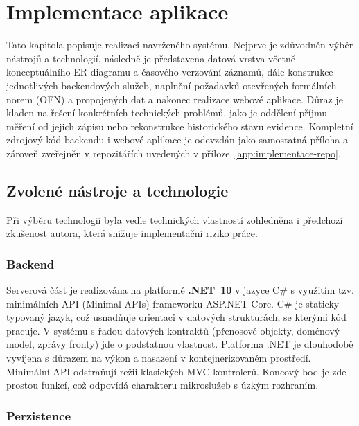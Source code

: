 \chapter{Implementace aplikace}
\label{ch:implementace}

Tato kapitola popisuje realizaci navrženého systému. Nejprve je zdůvodněn výběr nástrojů a technologií, následně je představena datová vrstva včetně konceptuálního ER diagramu a časového verzování záznamů, dále konstrukce jednotlivých backendových služeb, naplnění požadavků otevřených formálních norem (OFN) a propojených dat a nakonec realizace webové aplikace. Důraz je kladen na řešení konkrétních technických problémů, jako je oddělení příjmu měření od jejich zápisu nebo rekonstrukce historického stavu evidence. Kompletní zdrojový kód backendu i webové aplikace je odevzdán jako samostatná příloha a zároveň zveřejněn v repozitářích uvedených v příloze~\ref{app:implementace-repo}.

\section{Zvolené nástroje a technologie}

Při výběru technologií byla vedle technických vlastností zohledněna i předchozí zkušenost autora, která snižuje implementační riziko práce.


\subsection{Backend}

Serverová část je realizována na platformě \textbf{.NET~10} \parencite{NETBuildModern} v jazyce C\# s využitím tzv. minimálních API (Minimal APIs) frameworku ASP.NET Core. C\# je staticky typovaný jazyk, což usnadňuje orientaci v datových strukturách, se kterými kód pracuje. V systému s řadou datových kontraktů (přenosové objekty, doménový model, zprávy fronty) jde o podstatnou vlastnost. Platforma .NET je dlouhodobě vyvíjena s důrazem na výkon a nasazení v kontejnerizovaném prostředí. Minimální API odstraňují režii klasických MVC kontrolerů. Koncový bod je zde prostou funkcí, což odpovídá charakteru mikroslužeb s úzkým rozhraním.

\subsection{Perzistence}

